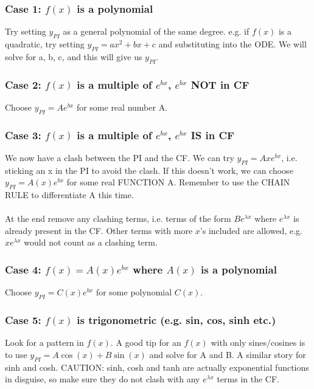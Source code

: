 \documentclass{scrartcl}
\begin{document}
\subsubsection*{Case 1: $ f(x) $ is a polynomial}
Try setting $ y_{PI} $ as a general polynomial of the same degree. e.g. if $ f(x) $ is a quadratic, try setting $ y_{PI} = ax^{2} + bx + c $ and substituting into the ODE. We will solve for a, b, c, and this will give us $ y_{PI} $.

\subsubsection*{Case 2: $ f(x) $ is a multiple of $ e^{bx} $, $ e^{bx} $ NOT in CF}
Choose $ y_{PI} = Ae^{bx} $ for some real number A.

\subsubsection*{Case 3: $ f(x) $ is a multiple of $ e^{bx} $, $ e^{bx} $ IS in CF}
We now have a clash between the PI and the CF. We can try $ y_{PI} = Axe^{bx} $, i.e. sticking an x in the PI to avoid the clash. If this doesn't work, we can choose $ y_{PI} = A(x)e^{bx} $ for some real FUNCTION A. Remember to use the CHAIN RULE to differentiate A this time.
\\\\
At the end remove any clashing terms, i.e. terms of the form $ Be^{\lambda x} $ where $ e^{\lambda x} $ is already present in the CF. Other terms with more $ x $'s included are allowed, e.g. $ xe^{\lambda x} $ would not count as a clashing term.

\subsubsection*{Case 4: $ f(x) = A(x)e^{bx} $ where $ A(x) $ is a polynomial}
Choose $ y_{PI} = C(x)e^{bx} $ for some polynomial $ C(x) $.

\subsubsection*{Case 5: $ f(x) $ is trigonometric (e.g. sin, cos, sinh etc.)}
Look for a pattern in $ f(x) $. A good tip for an $ f(x) $ with only sines/cosines is to use $ y_{PI} = A\cos(x) + B\sin(x) $ and solve for A and B. A similar story for sinh and cosh.
CAUTION: sinh, cosh and tanh are actually exponential functions in disguise, so make sure they do not clash with any $ e^{\lambda x} $ terms in the CF.
\end{document}
